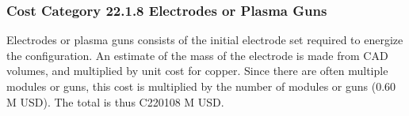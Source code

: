 \subsubsection*{Cost Category 22.1.8 Electrodes or Plasma Guns}

Electrodes or plasma guns consists of the initial electrode set required to energize the configuration. An estimate of the mass of the electrode is made from CAD volumes, and multiplied by unit
cost for copper. Since there are often multiple modules or guns, this cost is multiplied by the number of modules or guns (0.60 M USD). The total is thus C220108 M USD.

